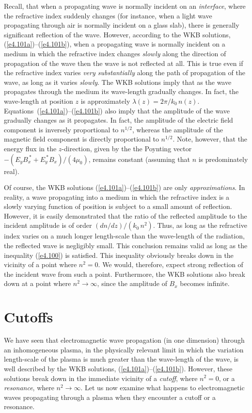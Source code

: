 Recall, that when a propagating wave is normally  incident on an {\em interface}, 
where the
refractive index  suddenly changes (for instance, when a light
wave propagating through
 air is normally incident on a glass slab), there is generally
significant  reflection of the wave. However, according to the WKB solutions,
(\ref{e4.101a})--(\ref{e4.101b}), when a propagating wave is normally incident on a medium in which
the refractive index changes {\em slowly}\/ along the direction of propagation of the
wave then the wave is not reflected at all. This is true 
even if the refractive index
varies {\em very substantially}\/ along the path of propagation of the wave,
as long as it varies {\em slowly}. The WKB
solutions imply that as the wave propagates through the medium its wave-length
gradually changes. In fact, the wave-length at position $z$ is approximately
$\lambda(z)= 2\pi/ k_0\,n(z)$. Equations~(\ref{e4.101a})--(\ref{e4.101b}) also imply that the amplitude
of the wave gradually changes as it propagates. In fact, the amplitude of the electric
field component is inversely proportional to $n^{1/2}$, whereas the amplitude of the
magnetic field component is directly proportional to $n^{1/2}$. 
Note, however, that the energy
flux in the $z$-direction, given by the the Poynting vector $-(E_y B_x^{~\ast}
+E_y^{~\ast} B_x)/(4\mu_0)$, remains constant (assuming that $n$ is predominately
real). 

Of course, the WKB solutions (\ref{e4.101a})--(\ref{e4.101b}) are only {\em approximations}. In reality,
a wave propagating into a medium in which the refractive index is a slowly
varying function of position is subject to a small amount of reflection. 
However, it is easily demonstrated that the ratio of the reflected amplitude
to the incident amplitude is of order $(dn/dz)/(k_0\,n^2)$. Thus, as long as
the refractive index varies on a much longer length-scale than the wave-length
of the radiation, the reflected wave is negligibly small. This conclusion remains
valid as long as the inequality (\ref{e4.100}) is satisfied.
 This inequality obviously 
 breaks down in the vicinity of a point where $n^2=0$. We would, therefore,
expect strong reflection of the incident wave from such a point.
Furthermore,  the WKB solutions also break down at a
point where $n^2\rightarrow\infty$, since the amplitude of $B_x$ becomes
infinite.

\section{Cutoffs}\label{s4.12}
We have seen that  electromagnetic wave propagation (in one dimension) through an
inhomogeneous plasma, in the physically relevant limit in which the variation
length-scale of the plasma is much greater than the wave-length of the wave,
is well described by the WKB solutions, (\ref{e4.101a})--(\ref{e4.101b}). However, these
solutions break down in the immediate vicinity of a {\em cutoff}, where
$n^2=0$, or a {\em resonance}, where $n^2\rightarrow\infty$. Let us
now examine what happens to electromagnetic waves propagating through
a plasma when they encounter a cutoff or a resonance.

